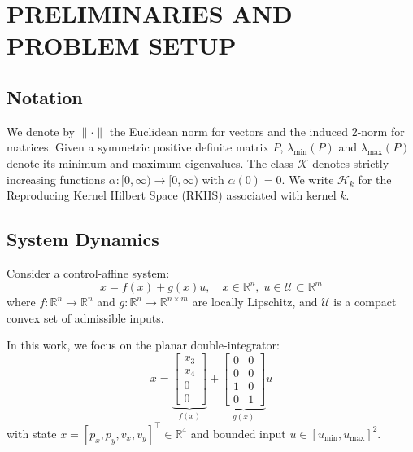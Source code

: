 \documentclass[letterpaper, 10 pt, conference]{ieeeconf}
\begin{document}
\section{PRELIMINARIES AND PROBLEM SETUP}
\label{sec:preliminaries}

\subsection{Notation}

We denote by $\|\cdot\|$ the Euclidean norm for vectors and the induced 2-norm for matrices. Given a symmetric positive definite matrix $P$, $\lambda_{\min}(P)$ and $\lambda_{\max}(P)$ denote its minimum and maximum eigenvalues. The class $\mathcal{K}$ denotes strictly increasing functions $\alpha: [0, \infty) \to [0, \infty)$ with $\alpha(0) = 0$. We write $\mathcal{H}_k$ for the Reproducing Kernel Hilbert Space (RKHS) associated with kernel $k$.

\subsection{System Dynamics}

Consider a control-affine system:
\begin{equation}\label{eq:dynamics}
    \dot{x} = f(x) + g(x) u, \quad x \in \mathbb{R}^n, \; u \in \mathcal{U} \subset \mathbb{R}^m
\end{equation}
where $f: \mathbb{R}^n \to \mathbb{R}^n$ and $g: \mathbb{R}^n \to \mathbb{R}^{n \times m}$ are locally Lipschitz, and $\mathcal{U}$ is a compact convex set of admissible inputs.

In this work, we focus on the planar double-integrator:
\begin{equation}\label{eq:double_int}
    \dot{x} = \underbrace{\begin{bmatrix} x_3 \\ x_4 \\ 0 \\ 0 \end{bmatrix}}_{f(x)} + \underbrace{\begin{bmatrix} 0 & 0 \\ 0 & 0 \\ 1 & 0 \\ 0 & 1 \end{bmatrix}}_{g(x)} u
\end{equation}
with state $x = [p_x, p_y, v_x, v_y]^\top \in \mathbb{R}^4$ and bounded input $u \in [u_{\min}, u_{\max}]^2$.
\end{document}
